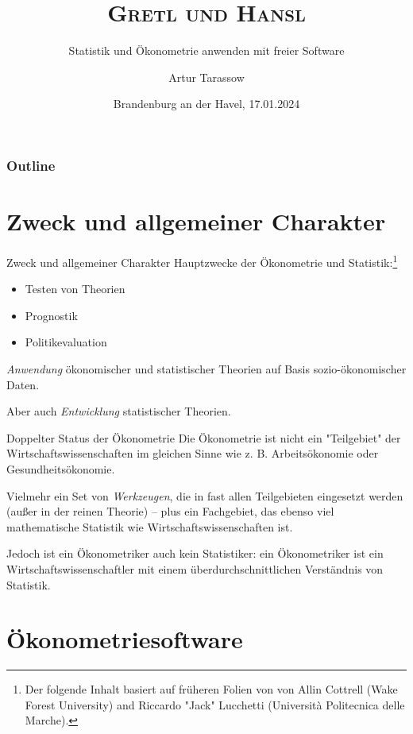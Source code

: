 \documentclass{beamer}[11pt]
\title{\textsc{Gretl und Hansl}}
\subtitle{Statistik und Ökonometrie anwenden mit freier Software}
\author[Tarassow] %
{Artur Tarassow\inst{1}\\
	\textsc{\small }
	}
\institute[] %
{
  \inst{1}%
  Fachbereich Wirtschaft\\
  Technische Hochschule
}
\date[] %
{Brandenburg an der Havel, 17.01.2024}
\begin{document}
\begin{frame}
	\titlepage
\end{frame}


\begin{frame}
	\frametitle{Outline}
	\tableofcontents%
\end{frame}


\section{Zweck und allgemeiner Charakter}


\begin{frame}{Zweck und allgemeiner Charakter}
	Hauptzwecke der Ökonometrie und Statistik:\footnote{Der folgende Inhalt basiert auf früheren Folien von von Allin Cottrell (Wake Forest University) and Riccardo "Jack" Lucchetti (Università Politecnica delle Marche).}

	\begin{itemize}
		\item Testen von Theorien
		\item Prognostik
		\item Politikevaluation
	\end{itemize}

	\medskip

	\emph{Anwendung} ökonomischer und statistischer Theorien auf Basis sozio-ökonomischer Daten.

	\medskip

	Aber auch \emph{Entwicklung} statistischer Theorien.
\end{frame}


\begin{frame}{Doppelter Status der Ökonometrie}
	Die Ökonometrie ist nicht ein "Teilgebiet" der Wirtschaftswissenschaften im gleichen Sinne wie z. B. Arbeitsökonomie oder Gesundheitsökonomie.

	\medskip

	Vielmehr ein Set von \emph{Werkzeugen}, die in fast allen Teilgebieten eingesetzt werden (außer in der reinen Theorie) -- plus ein Fachgebiet, das ebenso viel mathematische Statistik wie Wirtschaftswissenschaften ist.

	\medskip

	Jedoch ist ein Ökonometriker auch kein Statistiker: ein Ökonometriker ist ein Wirtschaftswissenschaftler mit einem überdurchschnittlichen Verständnis von Statistik.
\end{frame}


\section{Ökonometriesoftware}
\end{document}
